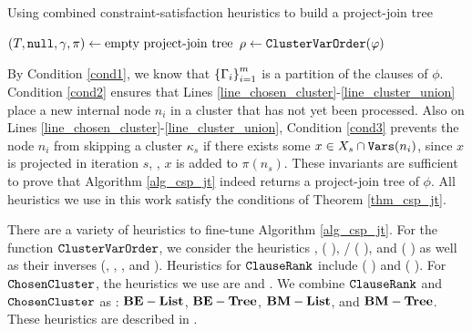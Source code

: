 \begin{algorithm*}[t]
\label{alg_csp_jt}
\caption{Using combined constraint-satisfaction heuristics to build a project-join tree}
    \DontPrintSemicolon
    $(T, \texttt{\upshape null}, \gamma, \pi) \gets \text{empty project-join tree}$\;
    $\rho \gets \texttt{\upshape ClusterVarOrder}(\varphi)$
\end{algorithm*}

By Condition \ref{cond1}, we know that $\left\{ \Gamma_i \right\}_{i = 1}^m$ is a partition of the clauses of $\phi$.
Condition \ref{cond2} ensures that Lines \ref{line_chosen_cluster}-\ref{line_cluster_union} place a new internal node $n_i$ in a cluster that has not yet been processed.
Also on Lines \ref{line_chosen_cluster}-\ref{line_cluster_union}, Condition \ref{cond3} prevents the node $n_i$ from skipping a cluster $\kappa_s$ if there exists some $x \in X_s \cap \texttt{\upshape Vars}(n_i)$, since $x$ is projected in iteration $s$, \ie, $x$ is added to $\pi(n_s)$.
These invariants are sufficient to prove that Algorithm \ref{alg_csp_jt} indeed returns a project-join tree of $\phi$.
All heuristics we use in this work satisfy the conditions of Theorem \ref{thm_csp_jt}.

There are a variety of heuristics to fine-tune Algorithm \ref{alg_csp_jt}.
For the function $\texttt{\upshape ClusterVarOrder}$, we consider the heuristics \Random, \Mcs{} ( \cite{tarjan1984simple}), \Lexp/\Lexm{} ( \cite{koster2001treewidth}), and \Minfill{} ( \cite{dechter03}) as well as their inverses (\Invmcs, \Invlexp, \Invlexm, and \Invminfill).
Heuristics for $\texttt{\upshape ClauseRank}$ include \Be{} ( \cite{dechter99}) and \Bm{} ( \cite{bouquet1999gestion}).
For $\texttt{\upshape ChosenCluster}$, the heuristics we use are \ListH{} and \TreeH{} \cite{DPV20}.
We combine $\texttt{\upshape ClauseRank}$ and $\texttt{\upshape ChosenCluster}$ as : $\textbf{BE}-\textbf{List}$, $\textbf{BE}-\textbf{Tree}$, $\textbf{BM}-\textbf{List}$, and $\textbf{BM}-\textbf{Tree}$.
These heuristics are described in \cite{DPV20}%
.

